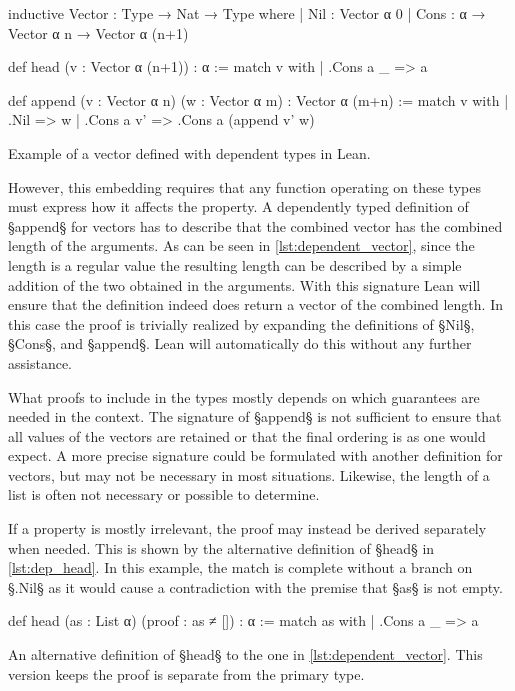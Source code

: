 \begin{listing}[H]
\begin{LeanCode}
inductive Vector : Type → Nat → Type where
  | Nil  : Vector α 0
  | Cons : α → Vector α n → Vector α (n+1)

def head (v : Vector α (n+1)) : α :=
  match v with
    | .Cons a _ => a

def append (v : Vector α n) (w : Vector α m) : Vector α (m+n) :=
  match v with
    | .Nil => w
    | .Cons a v' => .Cons a (append v' w)
\end{LeanCode}
\caption{Example of a vector defined with dependent types in Lean.}
\label{lst:dependent_vector}
\end{listing}

However, this embedding requires that any function operating on these types must express how it affects the property.
A dependently typed definition of §append§ for vectors has to describe that the combined vector has the combined length of the arguments.
As can be seen in \cref{lst:dependent_vector}, since the length is a regular value the resulting length can be described by a simple addition of the two obtained in the arguments.
With this signature Lean will ensure that the definition indeed does return a vector of the combined length.
In this case the proof is trivially realized by expanding the definitions of §Nil§, §Cons§, and §append§.
Lean will automatically do this without any further assistance.

What proofs to include in the types mostly depends on which guarantees are needed in the context.
The signature of §append§ is not sufficient to ensure that all values of the vectors are retained or that the final ordering is as one would expect.
A more precise signature could be formulated with another definition for vectors, but may not be necessary in most situations.
Likewise, the length of a list is often not necessary or possible to determine.

If a property is mostly irrelevant, the proof may instead be derived separately when needed.
This is shown by the alternative definition of §head§ in \cref{lst:dep_head}.
In this example, the match is complete without a branch on §.Nil§ as it would cause a contradiction with the premise that §as§ is not empty.

\begin{listing}[ht]
\begin{LeanCode}
def head (as : List α) (proof : as ≠ []) : α :=
  match as with
    | .Cons a _ => a
\end{LeanCode}
\caption[An alternative definition of §head§ to the one in \cref{lst:dependent_vector}.]{
  An alternative definition of §head§ to the one in \cref{lst:dependent_vector}.
  This version keeps the proof is separate from the primary type.
}
\label{lst:dep_head}
\end{listing}
